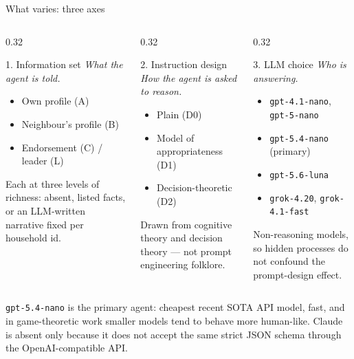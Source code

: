 \documentclass[aspectratio=169,10pt]{beamer}
\newcommand{\srcnote}[1]{{\tiny\color{gray}#1}}
\begin{document}
\begin{frame}{What varies: three axes}
  \begin{columns}[T,onlytextwidth]
    \begin{column}{0.32\textwidth}
      \begin{block}{1. Information set}
        \scriptsize
        \emph{What the agent is told.}
        \begin{itemize}\scriptsize
          \item Own profile (A)
          \item Neighbour's profile (B)
          \item Endorsement (C) / leader (L)
        \end{itemize}
        Each at three levels of richness: absent, listed facts, or an LLM-written
        narrative fixed per household id.
      \end{block}
    \end{column}
    \begin{column}{0.32\textwidth}
      \begin{block}{2. Instruction design}
        \scriptsize
        \emph{How the agent is asked to reason.}
        \begin{itemize}\scriptsize
          \item Plain (D0)
          \item Model of appropriateness (D1)
          \item Decision-theoretic (D2)
        \end{itemize}
        Drawn from cognitive theory and decision theory --- not prompt
        engineering folklore.
      \end{block}
    \end{column}
    \begin{column}{0.32\textwidth}
      \begin{block}{3. LLM choice}
        \scriptsize
        \emph{Who is answering.}
        \begin{itemize}\scriptsize
          \item \texttt{gpt-4.1-nano}, \texttt{gpt-5-nano}
          \item \texttt{gpt-5.4-nano} (primary)
          \item \texttt{gpt-5.6-luna}
          \item \texttt{grok-4.20}, \texttt{grok-4.1-fast}
        \end{itemize}
        Non-reasoning models, so hidden processes do not confound the
        prompt-design effect.
      \end{block}
    \end{column}
  \end{columns}
  \vfill
  \srcnote{\texttt{gpt-5.4-nano} is the primary agent: cheapest recent SOTA API
    model, fast, and in game-theoretic work smaller models tend to behave more
    human-like. Claude is absent only because it does not accept the same strict
    JSON schema through the OpenAI-compatible API.}
\end{frame}
\end{document}
